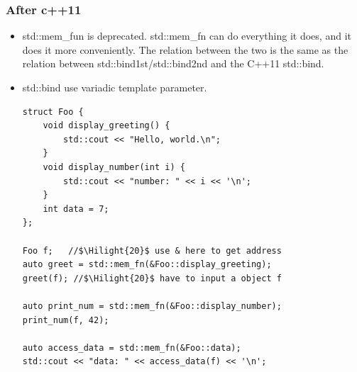 \documentclass[a4paper,11pt,twoside]{book}
\newcommand{\Hilight}[1]{\makebox[0pt][l]{\color{yellow}\rule[-3pt]{#1em}{11pt}}}
\newcommand{\Hilight}[1]{}
\begin{document}
\subsubsection{After c++11}
\begin{itemize}
	\item std::mem\_fun is deprecated. std::mem\_fn can do everything it does, and it does it more conveniently. The relation between the two is the same as the relation between std::bind1st/std::bind2nd and the C++11 std::bind. 
	
	\item std::bind use variadic template parameter.
	
\begin{lstlisting}
struct Foo {
	void display_greeting() {
		std::cout << "Hello, world.\n";
	}
	void display_number(int i) {
		std::cout << "number: " << i << '\n';
	}
	int data = 7;
};

Foo f;   //$\Hilight{20}$ use & here to get address
auto greet = std::mem_fn(&Foo::display_greeting);
greet(f); //$\Hilight{20}$ have to input a object f

auto print_num = std::mem_fn(&Foo::display_number);
print_num(f, 42);

auto access_data = std::mem_fn(&Foo::data);
std::cout << "data: " << access_data(f) << '\n';
\end{lstlisting}

\end{itemize}
\end{document}
